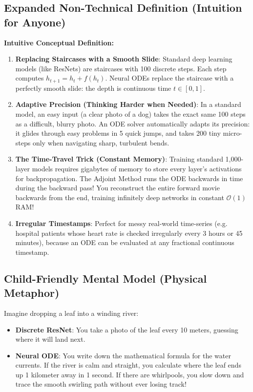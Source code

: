 \documentclass[11pt,a4paper]{article}
\theoremstyle{definition}
\begin{document}
\subsection{Expanded Non-Technical Definition (Intuition for Anyone)}
\textbf{Intuitive Conceptual Definition:}
\begin{enumerate}
    \item \textbf{Replacing Staircases with a Smooth Slide}: Standard deep learning models (like ResNets) are staircases with 100 discrete steps. Each step computes $h_{t+1} = h_t + f(h_t)$. Neural ODEs replace the staircase with a perfectly smooth slide: the depth is continuous time $t \in [0, 1]$.
    \item \textbf{Adaptive Precision (Thinking Harder when Needed)}: In a standard model, an easy input (a clear photo of a dog) takes the exact same 100 steps as a difficult, blurry photo. An ODE solver automatically adapts its precision: it glides through easy problems in 5 quick jumps, and takes 200 tiny micro-steps only when navigating sharp, turbulent bends.
    \item \textbf{The Time-Travel Trick (Constant Memory)}: Training standard 1,000-layer models requires gigabytes of memory to store every layer's activations for backpropagation. The Adjoint Method runs the ODE backwards in time during the backward pass! You reconstruct the entire forward movie backwards from the end, training infinitely deep networks in constant $\mathcal{O}(1)$ RAM!
    \item \textbf{Irregular Timestamps}: Perfect for messy real-world time-series (e.g. hospital patients whose heart rate is checked irregularly every 3 hours or 45 minutes), because an ODE can be evaluated at any fractional continuous timestamp.
\end{enumerate}

\subsection{Child-Friendly Mental Model (Physical Metaphor)}
Imagine dropping a leaf into a winding river:
\begin{itemize}
    \item \textbf{Discrete ResNet}: You take a photo of the leaf every 10 meters, guessing where it will land next.
    \item \textbf{Neural ODE}: You write down the mathematical formula for the water currents. If the river is calm and straight, you calculate where the leaf ends up 1 kilometer away in 1 second. If there are whirlpools, you slow down and trace the smooth swirling path without ever losing track!
\end{itemize}
\end{document}
